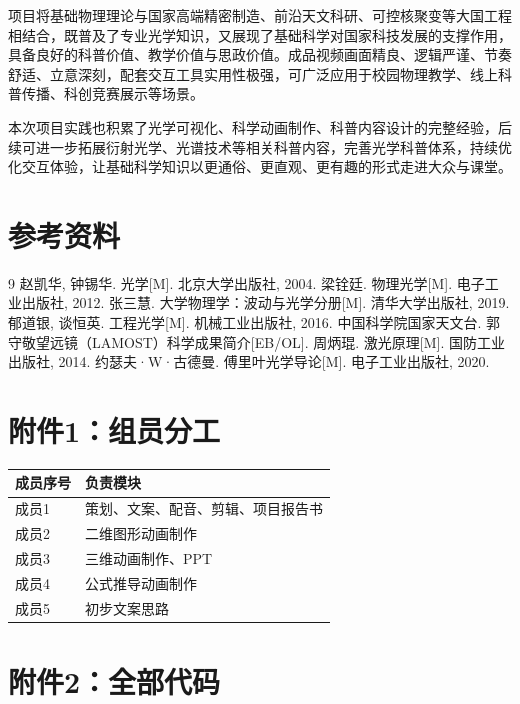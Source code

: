 \documentclass[12pt,a4paper]{ctexrep}
\begin{document}
项目将基础物理理论与国家高端精密制造、前沿天文科研、可控核聚变等大国工程相结合，既普及了专业光学知识，又展现了基础科学对国家科技发展的支撑作用，具备良好的科普价值、教学价值与思政价值。成品视频画面精良、逻辑严谨、节奏舒适、立意深刻，配套交互工具实用性极强，可广泛应用于校园物理教学、线上科普传播、科创竞赛展示等场景。

本次项目实践也积累了光学可视化、科学动画制作、科普内容设计的完整经验，后续可进一步拓展衍射光学、光谱技术等相关科普内容，完善光学科普体系，持续优化交互体验，让基础科学知识以更通俗、更直观、更有趣的形式走进大众与课堂。

\section{参考资料}

\begin{thebibliography}{9}
 赵凯华, 钟锡华. 光学[M]. 北京大学出版社, 2004.
 梁铨廷. 物理光学[M]. 电子工业出版社, 2012.
 张三慧. 大学物理学：波动与光学分册[M]. 清华大学出版社, 2019.
 郁道银, 谈恒英. 工程光学[M]. 机械工业出版社, 2016.
 中国科学院国家天文台. 郭守敬望远镜（LAMOST）科学成果简介[EB/OL].
 周炳琨. 激光原理[M]. 国防工业出版社, 2014.
 约瑟夫·W·古德曼. 傅里叶光学导论[M]. 电子工业出版社, 2020.
\end{thebibliography}

\section*{附件1：组员分工}

\begin{table}[htbp]
\centering
\begin{tabular}{ll}
\toprule
成员序号 & 负责模块 \\
\midrule
成员1 & 策划、文案、配音、剪辑、项目报告书 \\
成员2 & 二维图形动画制作 \\
成员3 & 三维动画制作、PPT \\
成员4 & 公式推导动画制作 \\
成员5 & 初步文案思路 \\
\bottomrule
\end{tabular}
\end{table}

\section*{附件2：全部代码}
\end{document}
